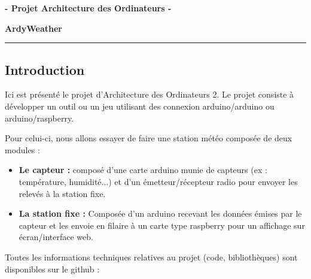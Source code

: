 \documentclass{article}
\begin{document}


\begin{center}
    \textbf{ - Projet Architecture des Ordinateurs - }

    \Large{\textbf{ArdyWeather}}
\end{center}

\rule{\linewidth}{1.5pt}



\justify

\subsection{Introduction}

Ici est présenté le projet d'Architecture des Ordinateurs 2. Le projet consiste à développer un outil ou un jeu 
utilisant des connexion arduino/arduino ou arduino/raspberry. 

Pour celui-ci, nous allons essayer de faire une station météo composée de deux modules : 
\begin{itemize}
    \item \textbf{Le capteur : } composé d'une carte arduino munie de capteurs (ex : température, humidité...) et d'un émetteur/récepteur 
    radio pour envoyer les relevés à la station fixe. 
    \item \textbf{La station fixe : } Composée d'un arduino recevant les données émises par le capteur et les envoie en filaire 
    à un carte type raspberry pour un affichage sur écran/interface web. 
\end{itemize}

Toutes les informations techniques relatives au projet (code, bibliothèques) sont disponibles sur le github : 
    
\end{document}
